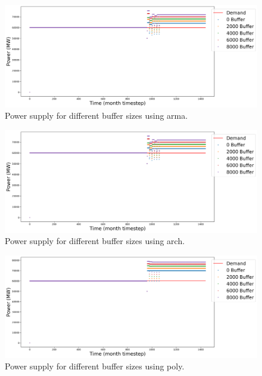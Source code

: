 \documentclass[11pt]{article}
\begin{document}
\begin{figure}[H]
	\centering
	\includegraphics[width=\textwidth]{29-figures/29-power-buffer-arma.png} 
	\hfill
	\caption{Power supply for different buffer sizes using arma.}
	\label{fig:29-buf-arma}
\end{figure}

\begin{figure}[H]
	\centering
	\includegraphics[width=\textwidth]{29-figures/29-power-buffer-arch.png} 
	\hfill
	\caption{Power supply for different buffer sizes using arch.}
	\label{fig:29-buf-arch}
\end{figure}

\begin{figure}[H]
	\centering
	\includegraphics[width=\textwidth]{29-figures/29-power-buffer-poly.png} 
	\hfill
	\caption{Power supply for different buffer sizes using poly.}
	\label{fig:29-buf-poly}
\end{figure}
\end{document}
